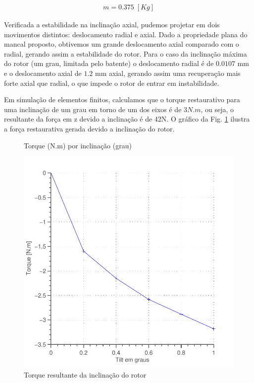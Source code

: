 \begin{align}
	m = 0.375 \; [Kg]
	\label{eq:massa}
\end{align}



Verificada a estabilidade na inclinação axial, pudemos projetar em dois movimentos distintos: deslocamento radial e axial. Dado a propriedade plana do mancal proposto, obtivemos um grande deslocamento axial comparado com o radial, gerando assim a estabilidade do rotor. Para o caso da inclinação máxima do rotor (um grau, limitada pelo batente) o deslocamento radial é de $0.0107$ mm e o deslocamento axial de $1.2$ mm axial, gerando assim uma recuperação mais forte axial que radial, o que impede o rotor de entrar em instabilidade.

Em simulação de elementos finitos, calculamos que o torque restaurativo para uma inclinação de um grau em torno de um dos eixos é de $3 N.m$, ou seja, o resultante da força em z devido a inclinação é de 42N. O gráfico da Fig. \ref{fig:passivo:torque:tilt} ilustra a força restaurativa gerada devido a inclinação do rotor.

\begin{figure}[!ht]
\centering
\caption*{Torque (N.m) por inclinação (grau) }
\includegraphics[width=0.7\linewidth]{Figs/Simulacoes/Passivo2/fem/passivo_otimizado_fem_tilt}
\caption{Torque resultante da inclinação do rotor}
\label{fig:passivo:torque:tilt} 
\end{figure}



